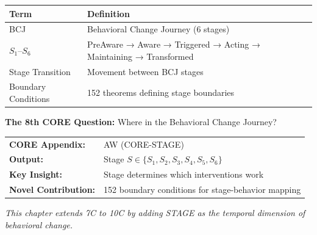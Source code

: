 \begin{tcolorbox}[
    colback=gray!5!white,
    colframe=gray!75!black,
    title={\textbf{Begriffe in diesem Kapitel}},
    fonttitle=\bfseries
]
\small
\begin{tabular}{@{}ll@{}}
\textbf{Term} & \textbf{Definition} \\
\midrule
BCJ & Behavioral Change Journey (6 stages) \\
$S_1$--$S_6$ & PreAware → Aware → Triggered → Acting → Maintaining → Transformed \\
Stage Transition & Movement between BCJ stages \\
Boundary Conditions & 152 theorems defining stage boundaries \\
\end{tabular}
\end{tcolorbox}


\begin{tcolorbox}[
    colback=teal!5!white,
    colframe=teal!75!black,
    title={\textbf{10C CORE Connection: STAGE (Question 5)}},
    fonttitle=\bfseries
]
\textbf{The 8th CORE Question:} Where in the Behavioral Change Journey?

\medskip
\begin{tabular}{ll}
\textbf{CORE Appendix:} & AW (CORE-STAGE) \\
\textbf{Output:} & Stage $S \in \{S_1, S_2, S_3, S_4, S_5, S_6\}$ \\
\textbf{Key Insight:} & Stage determines which interventions work \\
\textbf{Novel Contribution:} & 152 boundary conditions for stage-behavior mapping
\end{tabular}

\medskip
\textit{This chapter extends 7C to 10C by adding STAGE as the temporal dimension of behavioral change.}
\end{tcolorbox}

